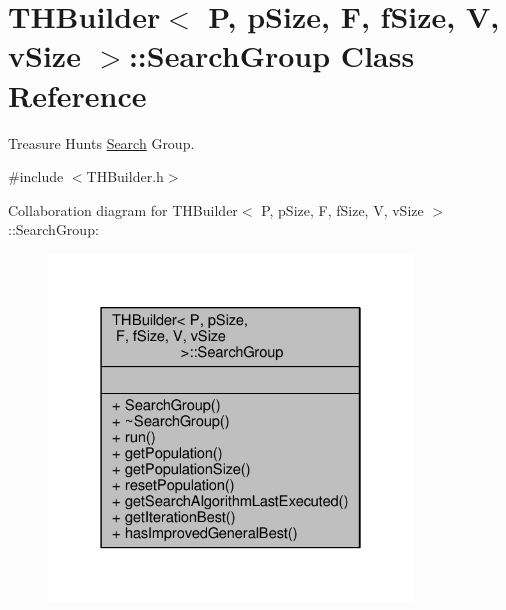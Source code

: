 \hypertarget{classTHBuilder_1_1SearchGroup}{}\section{T\+H\+Builder$<$ P, p\+Size, F, f\+Size, V, v\+Size $>$\+:\+:Search\+Group Class Reference}
\label{classTHBuilder_1_1SearchGroup}


Treasure Hunt\textquotesingle{}s \hyperlink{classSearch}{Search} Group.  




{\ttfamily \#include $<$T\+H\+Builder.\+h$>$}



Collaboration diagram for T\+H\+Builder$<$ P, p\+Size, F, f\+Size, V, v\+Size $>$\+:\+:Search\+Group\+:\nopagebreak
\begin{figure}[H]
\begin{center}
\leavevmode
\includegraphics[width=274pt]{classTHBuilder_1_1SearchGroup__coll__graph}
\end{center}
\end{figure}
